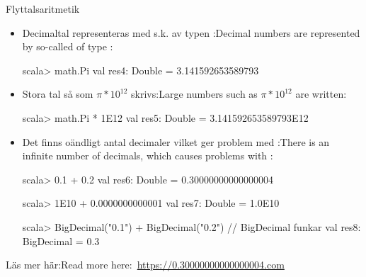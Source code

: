 \begin{Slide}{Flyttalsaritmetik}\SlideFontTiny
\begin{itemize}
\item \ifswedish Decimaltal representeras med s.k. \href{https://sv.wikipedia.org/wiki/Flyttal}{} av typen :\else Decimal numbers are represented by so-called \href{https://sv.wikipedia.org/wiki/Flyttal}{} of type :\fi
\begin{REPL}
scala> math.Pi
val res4: Double = 3.141592653589793
\end{REPL}

\item \ifswedish Stora tal så som $\pi*10^{12}$ skrivs:\else Large numbers such as $\pi*10^{12}$ are written:\fi
\begin{REPL}
scala> math.Pi * 1E12
val res5: Double = 3.141592653589793E12
\end{REPL}
\item \ifswedish Det finns  oändligt antal decimaler vilket ger problem med :\else There is  an infinite number of decimals, which causes problems with :\fi
\begin{REPL}
scala> 0.1 + 0.2
val res6: Double = 0.30000000000000004

scala> 1E10 + 0.0000000000001
val res7: Double = 1.0E10

scala> BigDecimal("0.1") + BigDecimal("0.2")  // BigDecimal funkar
val res8: BigDecimal = 0.3
\end{REPL}
\end{itemize}
\SlideFontTiny\vspace{-0.2em}\hfill \ifswedish Läs mer här:\else Read more here:\fi~\url{https://0.30000000000000004.com}
\end{Slide}


